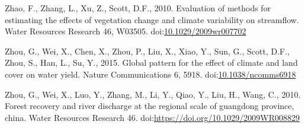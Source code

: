 \documentclass[]{elsarticle} %
\newlength{\cslhangindent}
\newlength{\cslentryspacingunit} %
\newenvironment{CSLReferences}[2] %
 {%
  \setlength{\parindent}{0pt}
  \ifodd #1
  \let\oldpar\par
  \def\par{\hangindent=\cslhangindent\oldpar}
  \fi
  \setlength{\parskip}{#2\cslentryspacingunit}
 }%
 {}
\begin{document}
\begin{CSLReferences}{1}{0}
\leavevmode{}%
Zhao, F., Zhang, L., Xu, Z., Scott, D.F., 2010. Evaluation of methods for estimating the effects of vegetation change and climate variability on streamflow. Water Resources Research 46, W03505. doi:\href{https://doi.org/10.1029/2009wr007702}{10.1029/2009wr007702}

\leavevmode{}%
Zhou, G., Wei, X., Chen, X., Zhou, P., Liu, X., Xiao, Y., Sun, G., Scott, D.F., Zhou, S., Han, L., Su, Y., 2015. Global pattern for the effect of climate and land cover on water yield. Nature Communications 6, 5918. doi:\href{https://doi.org/10.1038/ncomms6918}{10.1038/ncomms6918}

\leavevmode{}%
Zhou, G., Wei, X., Luo, Y., Zhang, M., Li, Y., Qiao, Y., Liu, H., Wang, C., 2010. Forest recovery and river discharge at the regional scale of guangdong province, china. Water Resources Research 46. doi:\url{https://doi.org/10.1029/2009WR008829}

\end{CSLReferences}
\end{document}
